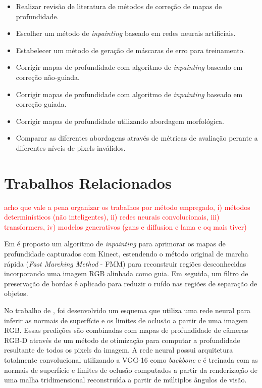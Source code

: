 \begin{itemize}
    \item Realizar revisão de literatura de métodos de correção de mapas de profundidade.
    \item Escolher um método de \textit{inpainting} baseado em redes neurais artificiais.
    \item Estabelecer um método de geração de máscaras de erro para treinamento.
    \item Corrigir mapas de profundidade com algoritmo de \textit{inpainting} baseado em correção não-guiada.
    \item Corrigir mapas de profundidade com algoritmo de \textit{inpainting} baseado em correção guiada.
    \item Corrigir mapas de profundidade utilizando abordagem morfológica.
    \item Comparar as diferentes abordagens através de métricas de avaliação perante a diferentes níveis de pixels inválidos.
    
\end{itemize}

\chapter{Trabalhos Relacionados}

\textcolor{red}{acho que vale a pena organizar os trabalhos por método empregado, i) métodos determinísticos (não inteligentes), ii) redes neurais convolucionais, iii) transformers, iv) modelos generativos (gans e diffusion e lama e oq mais tiver)}

Em  é proposto um algoritmo de \textit{inpainting} para aprimorar os mapas de profundidade capturados com Kinect, estendendo o método original de marcha rápida (\textit{Fast Marching Method} - FMM) para reconstruir regiões desconhecidas incorporando uma imagem RGB alinhada como guia. Em seguida, um filtro de preservação de bordas é aplicado para reduzir o ruído nas regiões de separação de objetos. 

No trabalho de , foi desenvolvido um esquema que utiliza uma rede neural para inferir as normais de superfície e os limites de oclusão a partir de uma imagem RGB. Essas predições são combinadas com mapas de profundidade de câmeras RGB-D através de um método de otimização para computar a profundidade resultante de todos os pixels da imagem. A rede neural possui arquitetura totalmente convolucional utilizando a VGG-16 como \textit{backbone} e é treinada com as normais de superfície e limites de oclusão computados a partir da renderização de uma malha tridimensional reconstruída a partir de múltiplos ângulos de visão. 
 

